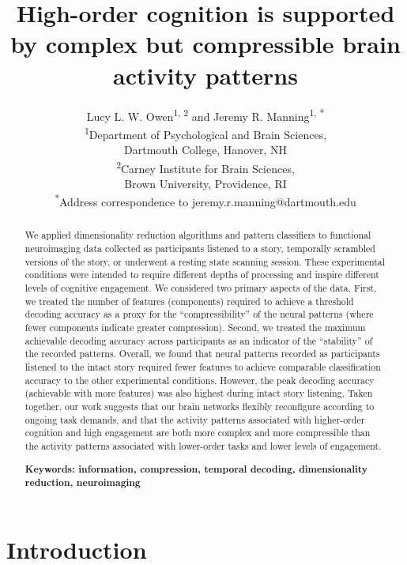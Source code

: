 \documentclass[english, 11pt]{article}
\title{High-order cognition is supported by complex but compressible brain activity patterns}
\author{Lucy L. W. Owen\textsuperscript{1, 2} and Jeremy R. Manning\textsuperscript{1,
*}\\\textsuperscript{1}Department of Psychological and Brain Sciences,\\Dartmouth College,
Hanover, NH\\[0.1cm]\textsuperscript{2}Carney Institute for Brain Sciences,\\Brown University,
Providence, RI\\[0.1cm] \textsuperscript{*}Address correspondence to
jeremy.r.manning@dartmouth.edu}
\begin{document}
\maketitle


\begin{abstract} 

We applied dimensionality reduction algorithms and pattern classifiers to
functional neuroimaging data collected as participants listened to a story,
temporally scrambled versions of the story, or underwent a resting state
scanning session. These experimental conditions were intended to require
different depths of processing and inspire different levels of cognitive
engagement. We considered two primary aspects of the data. First, we treated
the number of features (components) required to achieve a threshold decoding
accuracy as a proxy for the ``compressibility'' of the neural patterns (where
fewer components indicate greater compression). Second, we treated the
maximum achievable decoding accuracy across participants as an indicator of the
``stability'' of the recorded patterns. Overall, we found that neural patterns
recorded as participants listened to the intact story required fewer features
to achieve comparable classification accuracy to the other experimental
conditions. However, the peak decoding accuracy (achievable with more features)
was also highest during intact story listening. Taken together, our work
suggests that our brain networks flexibly reconfigure according to ongoing task
demands, and that the activity patterns associated with higher-order cognition
and high engagement are both more complex and more compressible than the
activity patterns associated with lower-order tasks and lower levels of
engagement.

\bigskip
\noindent
\textbf{Keywords: information, compression, temporal decoding, dimensionality reduction, neuroimaging}

\end{abstract}

\doublespacing

\section*{Introduction}
\end{document}
